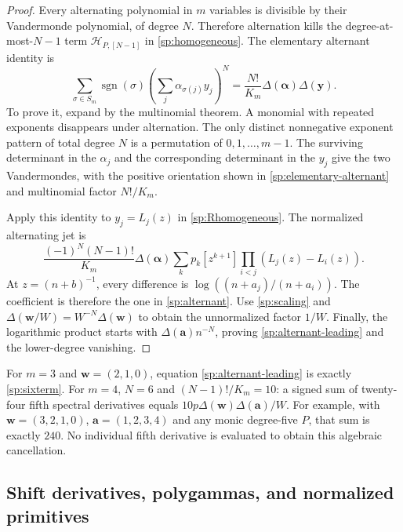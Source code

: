 \documentclass[11pt,letterpaper]{article}
\numberwithin{equation}{section}
\theoremstyle{plain}
\theoremstyle{definition}
\theoremstyle{remark}
\newcommand{\cH}{\mathcal H}
\begin{document}
\begin{proof}
Every alternating polynomial in $m$ variables is divisible by their
Vandermonde polynomial, of degree $N$. Therefore alternation kills
the degree-at-most-$N-1$ term $\cH_{P,[N-1]}$ in
\eqref{sp:homogeneous}. The elementary alternant identity is
\begin{equation}\label{sp:elementary-alternant}
 \sum_{\sigma\in S_m}\operatorname{sgn}(\sigma)
       \left(\sum_j\alpha_{\sigma(j)}y_j\right)^N
   =\frac{N!}{K_m}\Delta(\boldsymbol\alpha)\Delta(\boldsymbol y).
\end{equation}
To prove it, expand by the multinomial theorem. A monomial with
repeated exponents disappears under alternation. The only distinct
nonnegative exponent pattern of total degree $N$ is a permutation
of $0,1,\ldots,m-1$. The surviving determinant in the $\alpha_j$
and the corresponding determinant in the $y_j$ give the two
Vandermondes, with the positive orientation shown in
\eqref{sp:elementary-alternant} and multinomial factor $N!/K_m$.

Apply this identity to $y_j=L_j(z)$ in
\eqref{sp:Rhomogeneous}. The normalized alternating jet is
\[
 \frac{(-1)^N(N-1)!}{K_m}\Delta(\boldsymbol\alpha)
           \sum_kp_k[z^{k+1}]\prod_{i<j}(L_j(z)-L_i(z)).
\]
At $z=(n+b)^{-1}$, every difference is
$\log((n+a_j)/(n+a_i))$. The coefficient is therefore the one
in \eqref{sp:alternant}. Use \eqref{sp:scaling} and
$\Delta(\boldsymbol w/W)=W^{-N}\Delta(\boldsymbol w)$ to obtain
the unnormalized factor $1/W$. Finally, the logarithmic product
starts with $\Delta(\boldsymbol a)n^{-N}$, proving
\eqref{sp:alternant-leading} and the lower-degree vanishing.
\end{proof}

For $m=3$ and $\boldsymbol w=(2,1,0)$, equation
\eqref{sp:alternant-leading} is exactly \eqref{sp:sixterm}.
For $m=4$, $N=6$ and $(N-1)!/K_m=10$: a signed sum of
twenty-four fifth spectral derivatives equals
$10p\Delta(\boldsymbol w)\Delta(\boldsymbol a)/W$.
For example, with $\boldsymbol w=(3,2,1,0)$,
$\boldsymbol a=(1,2,3,4)$ and any monic degree-five $P$, that
sum is exactly $240$. No individual fifth derivative is evaluated
to obtain this algebraic cancellation.

\subsection{Shift derivatives, polygammas, and normalized primitives}
\end{document}
